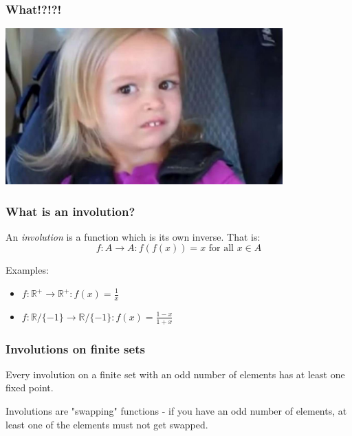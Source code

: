 \documentclass{beamer}
\begin{document}
\begin{frame}
	\frametitle{What!?!?!}

        \begin{center}
             \includegraphics[width=0.8\textwidth]{side-eye-chloe.jpg}
        \end{center}

\end{frame}

\begin{frame}
	\frametitle{What is an involution?}

	An {\em involution} is a function which is its own inverse. That is:
	\[ f: A \rightarrow A : f(f(x)) = x \text{ for all } x \in A \]

	Examples:
	\begin{itemize}
		\item $ f:\mathbb{R}^+ \rightarrow \mathbb{R}^+: f(x) = \frac{1}{x} $
		\item $ f:\mathbb{R}/\{-1\} \rightarrow \mathbb{R}/\{-1\}: f(x) = \frac{1-x}{1+x} $
	\end{itemize}

\end{frame}
\begin{frame}
	\frametitle{Involutions on finite sets}

	Every involution on a finite set with an odd number of elements has at least one fixed point.

	Involutions are "swapping" functions - if you have an odd number of elements, at least one of
	the elements must not get swapped.
\end{frame}
\end{document}
